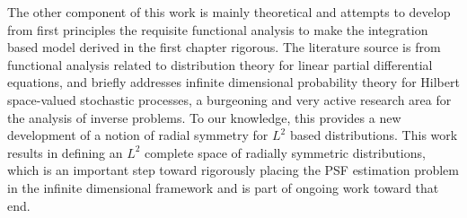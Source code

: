 \indent
The other component of this work is mainly theoretical and attempts to develop from first principles the requisite functional analysis to make the integration based model derived in the first chapter rigorous.
The literature source is from functional analysis related to distribution theory for linear partial differential equations, and briefly addresses infinite dimensional probability theory for Hilbert space-valued stochastic processes, a burgeoning and very active research area for the analysis of inverse problems.
To our knowledge, this provides a new development of a notion of radial symmetry for $L^2$ based distributions.
This work results in defining an $L^2$ complete space of radially symmetric distributions, which is an important step toward rigorously placing the PSF estimation problem in the infinite dimensional framework and is part of ongoing work toward that end.

\pagebreak
